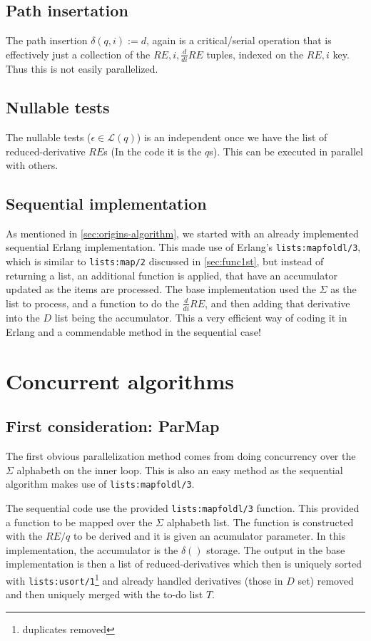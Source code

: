 \documentclass[a4paper,11pt]{report}
\begin{document}
\subsection{Path insertation}
The path insertion $\delta(q,i):=d$, again is a critical/serial operation
that is effectively just a collection of the $RE,i,\frac{d}{di}RE$
tuples, indexed on the $RE,i$ key. Thus this is not easily parallelized.

\subsection{Nullable tests}
The nullable tests ($\epsilon\in \mathcal{L}(q)$) is an independent
once we have the list of reduced-derivative $RE$s (In the code it is
the $q$s). This can be executed in parallel with others.

\subsection{Sequential implementation}

As mentioned in \ref{sec:origins-algorithm}, we started with an
already implemented sequential Erlang implementation. This made use of
Erlang's \texttt{lists:mapfoldl/3}, which is similar to
\texttt{lists:map/2} discussed in \ref{sec:func1st}, but instead of
returning a list, an additional function is applied, that have an
accumulator updated as the items are processed. The base
implementation used the $\Sigma$ as the list to process, and a
function to do the $\frac{d}{di}RE$, and then adding that derivative
into the $D$ list being the accumulator. This a very efficient way of
coding it in Erlang and a commendable method in the sequential case!

\section{Concurrent algorithms}

\subsection{First consideration: ParMap}
\label{sec:strausparmap}

The first obvious parallelization method comes from doing concurrency
over the $\Sigma$ alphabeth on the inner loop. This is also an easy method
as the sequential algorithm makes use of \texttt{lists:mapfoldl/3}.

The sequential code use the provided
\texttt{lists:mapfoldl/3} function. This provided a function to be
mapped over the $\Sigma$ alphabeth list. The function is constructed
with the $RE/q$ to be derived and it is given an acumulator
parameter. In this implementation, the accumulator is the
$\delta()$ storage. The output in the base implementation is then a
list of reduced-derivatives which then is uniquely sorted
with \texttt{lists:usort/1}\footnote{duplicates removed} and already
handled derivatives (those in $D$ set) removed and then uniquely
merged with the to-do list $T$.
\end{document}
